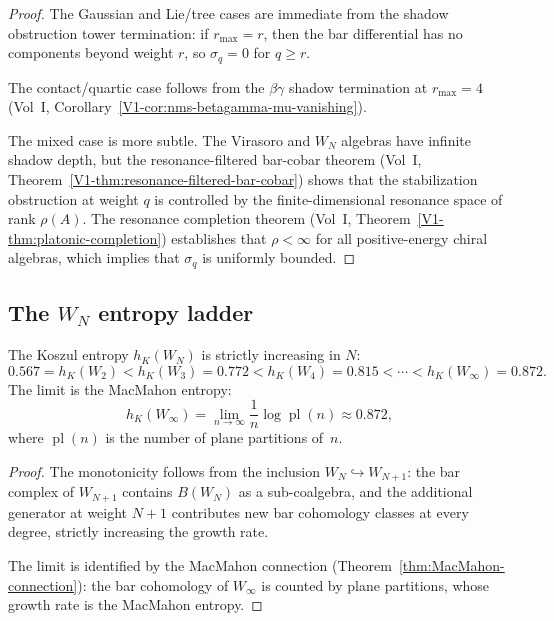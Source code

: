 \begin{proof}
The Gaussian and Lie/tree cases are immediate from the shadow obstruction tower
termination: if $r_{\max} = r$, then the bar differential has no
components beyond weight $r$, so $\sigma_q = 0$ for $q \ge r$.

The contact/quartic case follows from the $\beta\gamma$ shadow
termination at $r_{\max} = 4$
(Vol~I, Corollary~\ref*{V1-cor:nms-betagamma-mu-vanishing}).

The mixed case is more subtle. The Virasoro and $W_N$ algebras have
infinite shadow depth, but the resonance-filtered bar-cobar theorem
(Vol~I, Theorem~\ref*{V1-thm:resonance-filtered-bar-cobar})
shows that the stabilization obstruction at weight $q$ is controlled
by the finite-dimensional resonance space of rank $\rho(A)$.
The resonance completion theorem
(Vol~I, Theorem~\ref*{V1-thm:platonic-completion})
establishes that $\rho < \infty$ for all positive-energy chiral algebras,
which implies that $\sigma_q$ is uniformly bounded.
\end{proof}

\subsection{The $W_N$ entropy ladder}

\begin{theorem}
The Koszul entropy $h_K(W_N)$ is strictly increasing in $N$:
\[
0.567 = h_K(W_2)
< h_K(W_3) = 0.772
< h_K(W_4) = 0.815
< \cdots
< h_K(W_\infty) = 0.872.
\]
The limit is the MacMahon entropy:
\begin{equation}%
h_K(W_\infty)
=
\lim_{n \to \infty} \frac{1}{n}\log\operatorname{pl}(n)
\approx 0.872,
\end{equation}
where $\operatorname{pl}(n)$ is the number of plane partitions of~$n$.
\end{theorem}

\begin{proof}
The monotonicity follows from the inclusion
$W_N \hookrightarrow W_{N+1}$: the bar complex of $W_{N+1}$ contains
$B(W_N)$ as a sub-coalgebra, and the additional generator at weight
$N+1$ contributes new bar cohomology classes at every degree, strictly
increasing the growth rate.

The limit is identified by the MacMahon connection
(Theorem~\ref{thm:MacMahon-connection}): the bar cohomology of $W_\infty$
is counted by plane partitions, whose growth rate is the MacMahon entropy.
\end{proof}

